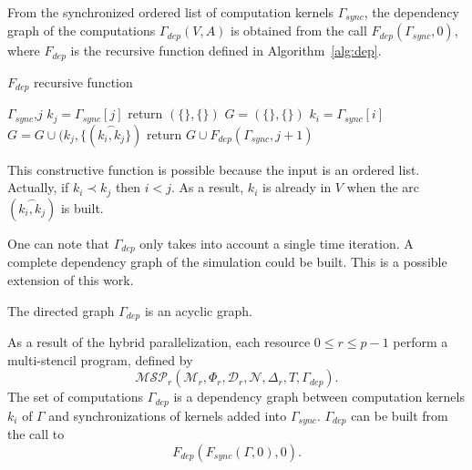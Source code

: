 \begin{mydef}
From the synchronized ordered list of computation kernels $\Gamma_{sync}$, the dependency graph of the computations $\Gamma_{dep}(V,A)$ is obtained from the call $F_{dep}(\Gamma_{sync},0)$, where $F_{dep}$ is the recursive function defined in Algorithm~\ref{alg:dep}.
\end{mydef}

\begin{algorithm}
\caption{$F_{dep}$ recursive function}
\label{alg:dep}
\begin{algorithmic}[1]
 {$\Gamma_{sync}$,$j$}
\State $k_j = \Gamma_{sync}[j]$
\State return $(\{\},\{\})$
\State $G=(\{\},\{\})$
\State $k_i = \Gamma_{sync}[i]$
\State $G = G \cup (k_j, \{(\overset{\frown}{k_i,k_j} \})$
\EndIf
\EndFor
\State return $G \cup F_{dep}(\Gamma_{sync},j+1)$
\EndIf
\EndProcedure
\end{algorithmic}
\end{algorithm}

This constructive function is possible because the input is an ordered list. Actually, if $k_i\prec k_j$ then $i<j$. As a result, $k_i$ is already in $V$ when the arc $(\overset{\frown}{k_i,k_j})$ is built.

One can note that $\Gamma_{dep}$ only takes into account a single time iteration. A complete dependency graph of the simulation could be built. This is a possible extension of this work.

\begin{myprop}
The directed graph $\Gamma_{dep}$ is an acyclic graph.
\end{myprop}

As a result of the hybrid parallelization, each resource $0 \leq r \leq p-1$ perform a multi-stencil program, defined by
\begin{equation*}
\mathcal{MSP}_r(\mathcal{M}_r,\Phi_r,\mathcal{D}_r,\mathcal{N},\Delta_r,T,\Gamma_{dep}).
\end{equation*}
The set of computations $\Gamma_{dep}$ is a dependency graph between computation kernels $k_i$ of $\Gamma$ and synchronizations of kernels added into $\Gamma_{sync}$. $\Gamma_{dep}$ can be built from the call to 
\begin{equation*}
F_{dep}(F_{sync}(\Gamma,0),0).
\end{equation*}

